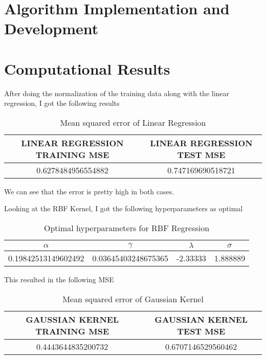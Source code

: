 \documentclass[11pt]{amsart}
\begin{document}
\section{Algorithm Implementation and Development}\label{sec:algorithms}




\section{Computational Results}\label{sec:results}
After doing the normalization of the training data along with the linear regression, I got the following results 

\begin{table}[H]
    \centering
    \begin{tabular}{| c | c |}
         \hline
         LINEAR REGRESSION TRAINING MSE & LINEAR REGRESSION TEST MSE\\ \hline
         0.6278484956554882 & 0.747169690518721 \\ \hline
    \end{tabular}
    \caption{Mean squared error of Linear Regression}
    \label{tab:LinearRegressionMSE}
\end{table}

We can see that the error is pretty high in both cases. 

Looking at the RBF Kernel, I got the following hyperparameters as optimal

\begin{table}[H]
    \centering
    \begin{tabular}{| c | c | c | c |}
         \hline
         $\alpha$ & $\gamma$ & $\lambda$ & $\sigma$ \\ \hline
         0.19842513149602492 & 0.03645403248675365 & -2.33333 & 1.888889\\ \hline
    \end{tabular}
    \caption{Optimal hyperparameters for RBF Regression}
    \label{tab:OptRBF}
\end{table}

This resulted in the following MSE

\begin{table}[H]
    \centering
    \begin{tabular}{| c | c |}
         \hline
         GAUSSIAN KERNEL TRAINING MSE & GAUSSIAN KERNEL TEST MSE\\ \hline
         0.4443644835200732 & 0.6707146529560462 \\ \hline
    \end{tabular}
    \caption{Mean squared error of Gaussian Kernel}
    \label{tab:GaussianKernelMSE}
\end{table}
\end{document}
